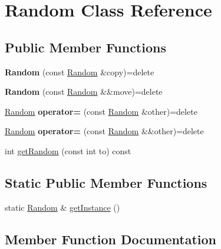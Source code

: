 \hypertarget{classRandom}{}\section{Random Class Reference}
\label{classRandom}
\subsection*{Public Member Functions}
\begin{DoxyCompactItemize}
\item 
\mbox{\label{classRandom_add681ff260733a7075cebcec23a4f596}} 
{\bfseries Random} (const \hyperlink{classRandom}{Random} \&copy)=delete
\item 
\mbox{\label{classRandom_a2d93c9ddddcc84379bf1476b584d5793}} 
{\bfseries Random} (const \hyperlink{classRandom}{Random} \&\&move)=delete
\item 
\mbox{\label{classRandom_a8dd76f36034c5f247db2a4f191081deb}} 
\hyperlink{classRandom}{Random} {\bfseries operator=} (const \hyperlink{classRandom}{Random} \&other)=delete
\item 
\mbox{\label{classRandom_a51effd8a6f7ca0cf4e11c447401fde54}} 
\hyperlink{classRandom}{Random} {\bfseries operator=} (const \hyperlink{classRandom}{Random} \&\&other)=delete
\item 
int \hyperlink{classRandom_a8d04412a06213d3c3b279bbd54e2981e}{get\+Random} (const int to) const
\end{DoxyCompactItemize}
\subsection*{Static Public Member Functions}
\begin{DoxyCompactItemize}
\item 
static \hyperlink{classRandom}{Random} \& \hyperlink{classRandom_a2aa30d2f678fc76f75efc60356c6ea4d}{get\+Instance} ()
\end{DoxyCompactItemize}


\subsection{Member Function Documentation}
\mbox{\label{classRandom_a2aa30d2f678fc76f75efc60356c6ea4d}} 
